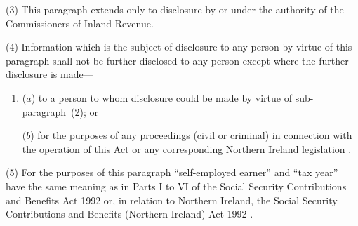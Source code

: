 \documentclass[12pt,a4paper]{article}
\begin{document}
(3) This paragraph extends only to disclosure by or under the authority of the Commissioners of Inland Revenue.

(4) Information which is the subject of disclosure to any person by virtue of this paragraph shall not be further disclosed to any person except where the further disclosure is made—
\begin{enumerate}\item[]
($a$) to a person to whom disclosure could be made by virtue of sub-\hspace{0pt}paragraph~(2); or

($b$) for the purposes of any proceedings (civil or criminal) in connection with the operation of this Act
or any corresponding Northern Ireland legislation%
.
\end{enumerate}

(5) For the purposes of this paragraph “self-employed earner” and “tax year” have the same meaning as in Parts I to VI of the Social Security Contributions and Benefits Act 1992
or, in relation to Northern Ireland, the Social Security Contributions and Benefits (Northern Ireland) Act 1992%
.

\end{document}
